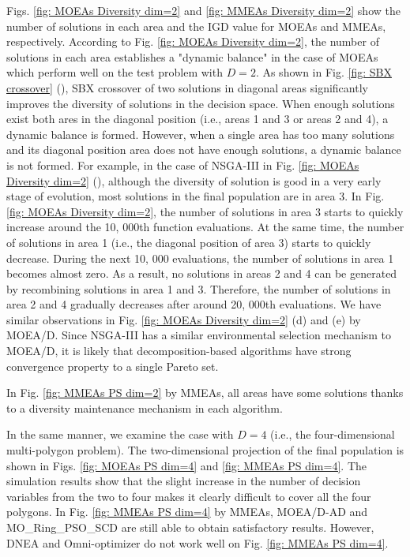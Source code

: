 \documentclass[conference]{IEEEtran}
\begin{document}
Figs. \ref{fig: MOEAs Diversity dim=2} and \ref{fig: MMEAs Diversity dim=2} show the number of solutions in each area and the IGD value for MOEAs and MMEAs, respectively. According to Fig. \ref{fig: MOEAs Diversity dim=2}, the number of solutions in each area establishes a "dynamic balance" in the case of MOEAs which perform well on the test problem with $D=2$. As shown in Fig. \ref{fig: SBX crossover} (), SBX crossover of two solutions in diagonal areas significantly improves the diversity of solutions in the decision space. When enough solutions exist both ares in the diagonal position (i.e., areas 1 and 3 or areas 2 and 4), a dynamic balance is formed. However, when a single area has too many solutions and its diagonal position area does not have enough solutions, a dynamic balance is not formed. For example, in the case of NSGA-III in Fig. \ref{fig: MOEAs Diversity dim=2} (), although the diversity of solution is good in a very early stage of evolution, most solutions in the final population are in area 3. In Fig. \ref{fig: MOEAs Diversity dim=2}, the number of solutions in area 3 starts to quickly increase around the 10, 000th function evaluations. At the same time, the number of solutions in area 1 (i.e., the diagonal position of area 3) starts to quickly decrease. During the next 10, 000 evaluations, the number of solutions in area 1 becomes almost zero. As a result, no solutions in areas 2 and 4 can be generated by recombining solutions in area 1 and 3. Therefore, the number of solutions in area 2 and 4 gradually decreases after around 20, 000th evaluations. We have similar observations in Fig. \ref{fig: MOEAs Diversity dim=2} (d) and (e) by MOEA/D. Since NSGA-III has a similar environmental selection mechanism to MOEA/D, it is likely that decomposition-based algorithms have strong convergence property to a single Pareto set.

In Fig. \ref{fig: MMEAs PS dim=2} by MMEAs, all areas have some solutions thanks to a diversity maintenance mechanism in each algorithm.

In the same manner, we examine the case with $D=4$ (i.e., the four-dimensional multi-polygon problem). The two-dimensional projection of the final population is shown in Figs. \ref{fig: MOEAs PS dim=4} and \ref{fig: MMEAs PS dim=4}. The simulation results show that the slight increase in the number of decision variables from the two to four makes it clearly difficult to cover all the four polygons. In Fig. \ref{fig: MMEAs PS dim=4} by MMEAs, MOEA/D-AD and MO\_Ring\_PSO\_SCD are still able to obtain satisfactory results. However, DNEA and Omni-optimizer do not work well on Fig. \ref{fig: MMEAs PS dim=4}. 
\end{document}
